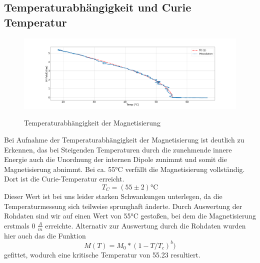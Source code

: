     \subsection{Temperaturabhängigkeit und Curie Temperatur}
        \begin{figure}[H]
            \centering
            \includegraphics[width=\textwidth]{Images/Teil3.png}
            \label{Temp}
            \caption{Temperaturabhängigkeit der Magnetisierung}
        \end{figure}
        Bei Aufnahme der Temperaturabhängigkeit der Magnetisierung ist deutlich zu Erkennen, das bei Steigenden Temperaturen durch die zunehmende innere Energie
        auch die Unordnung der internen Dipole zunimmt und somit die Magnetisierung abnimmt. Bei ca. 55°C verfällt die Magnetisierung vollständig. Dort ist die Curie-Temperatur erreicht.
        $$T_C  = (55 \pm 2)\text{°C}$$
        Dieser Wert ist bei uns leider starken Schwankungen unterlegen, da die Temperaturmessung sich teilweise sprunghaft änderte. Durch Auswertung der Rohdaten sind wir auf einen Wert von 55°C gestoßen, bei dem die Magnetisierung erstmals
        0 $\frac{A}{m}$ erreichte. Alternativ zur Auswertung durch die Rohdaten wurden hier auch das die Funktion
        $$ M(T) = M_0 * (1 - T/T_c)^b)$$
        gefittet, wodurch eine kritische Temperatur von 55.23 resultiert.
